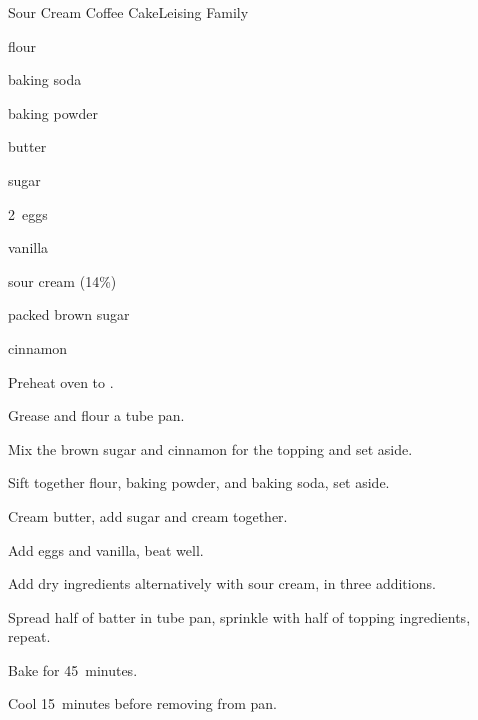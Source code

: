 \begin{recipe}{Sour Cream Coffee Cake}{Leising Family}{}

\begin{ingredients}
\item {} flour
\item {} baking soda
\item {} baking powder
\item \C{\half} butter
\item {} sugar
\item 2~eggs
\item {} vanilla
\item \C{1\threequarter} sour cream (14\%)
\item \C{\quarter} packed brown sugar
\item \tp{1\half} cinnamon
\end{ingredients}

\begin{directions}
\item Preheat oven to .
\item Grease and flour a  tube pan.
\item Mix the brown sugar and cinnamon for the topping and set aside.
\item Sift together flour, baking powder, and baking soda, set aside.
\item Cream butter, add sugar and cream together.
\item Add eggs and vanilla, beat well.
\item Add dry ingredients alternatively with sour cream, in three additions.
\item Spread half of batter in tube pan, sprinkle with half of topping ingredients, repeat.
\item Bake for 45~minutes.
\item Cool 15~minutes before removing from pan.
\end{directions}

\end{recipe}
